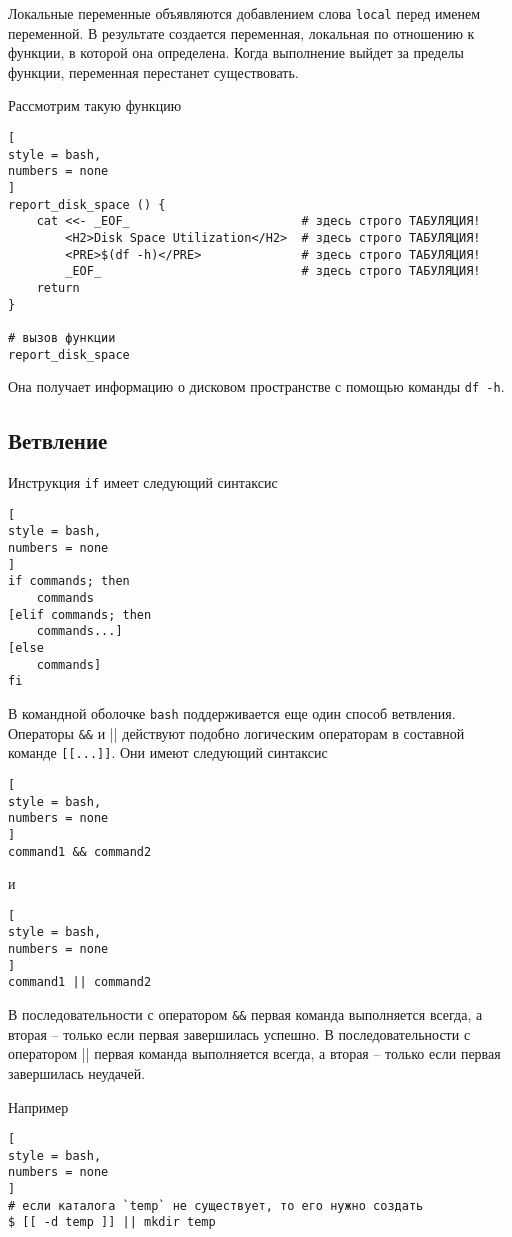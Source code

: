 \documentclass[%
	11pt,
	a4paper,
	utf8,
		]{article}
\begin{document}
Локальные переменные объявляются добавлением слова \texttt{local} перед именем переменной. В результате создается переменная, локальная по отношению к функции, в которой она определена. Когда выполнение выйдет за пределы функции, переменная перестанет существовать.

Рассмотрим такую функцию
\begin{lstlisting}[
style = bash,
numbers = none
]
report_disk_space () {
    cat <<- _EOF_                        # здесь строго ТАБУЛЯЦИЯ!
        <H2>Disk Space Utilization</H2>  # здесь строго ТАБУЛЯЦИЯ!
        <PRE>$(df -h)</PRE>              # здесь строго ТАБУЛЯЦИЯ!
        _EOF_                            # здесь строго ТАБУЛЯЦИЯ!
    return
}

# вызов функции
report_disk_space
\end{lstlisting}

Она получает информацию о дисковом пространстве с помощью команды \verb|df -h|.

\subsection{Ветвление}

Инструкция \texttt{if} имеет следующий синтаксис
\begin{lstlisting}[
style = bash,
numbers = none
]
if commands; then
    commands
[elif commands; then
    commands...]
[else
    commands]
fi
\end{lstlisting}

В командной оболочке \texttt{bash} поддерживается еще один способ ветвления. Операторы \verb|&&| и \verb|||| действуют подобно логическим операторам в составной команде \verb|[[...]]|. Они имеют следующий синтаксис
\begin{lstlisting}[
style = bash,
numbers = none
]
command1 && command2
\end{lstlisting}
и
\begin{lstlisting}[
style = bash,
numbers = none
]
command1 || command2
\end{lstlisting}

В последовательности с оператором \verb|&&| первая команда выполняется всегда, а вторая -- только если первая завершилась успешно. В последовательности с оператором \verb|||| первая команда выполняется всегда, а вторая -- только если первая завершилась неудачей.

Например
\begin{lstlisting}[
style = bash,
numbers = none
]
# если каталога `temp` не существует, то его нужно создать
$ [[ -d temp ]] || mkdir temp
\end{lstlisting}
\end{document}
